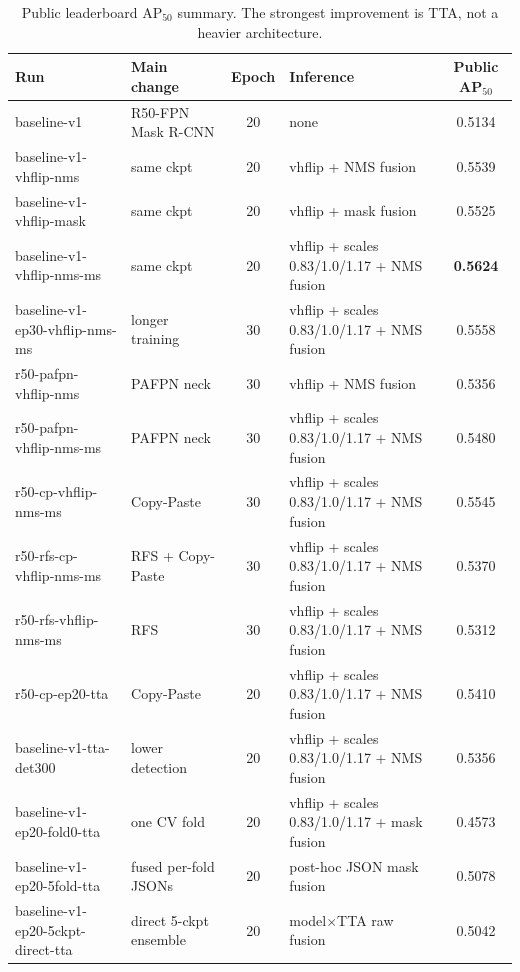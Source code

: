 \documentclass[10pt,twocolumn,letterpaper]{article}
\begin{document}
\begin{table}[t]
  \centering
  \scriptsize
  \setlength{\tabcolsep}{3pt}
  \begin{tabularx}{\textwidth}{p{}p{}cXc}
    \toprule
    \textbf{Run} & \textbf{Main change} & \textbf{Epoch} & \textbf{Inference} & \textbf{Public AP$_{50}$} \\ \midrule
    baseline-v1 & R50-FPN Mask R-CNN & 20 & none & 0.5134 \\
    baseline-v1-vhflip-nms & same ckpt & 20 & vhflip + NMS fusion & 0.5539 \\
    baseline-v1-vhflip-mask & same ckpt & 20 & vhflip + mask fusion & 0.5525 \\
    baseline-v1-vhflip-nms-ms & same ckpt & 20 & vhflip + scales 0.83/1.0/1.17 + NMS fusion & \textbf{0.5624} \\
    baseline-v1-ep30-vhflip-nms-ms & longer training & 30 & vhflip + scales 0.83/1.0/1.17 + NMS fusion & 0.5558 \\
    r50-pafpn-vhflip-nms & PAFPN neck & 30 & vhflip + NMS fusion & 0.5356 \\
    r50-pafpn-vhflip-nms-ms & PAFPN neck & 30 & vhflip + scales 0.83/1.0/1.17 + NMS fusion & 0.5480 \\
    r50-cp-vhflip-nms-ms & Copy-Paste & 30 & vhflip + scales 0.83/1.0/1.17 + NMS fusion & 0.5545 \\
    r50-rfs-cp-vhflip-nms-ms & RFS + Copy-Paste & 30 & vhflip + scales 0.83/1.0/1.17 + NMS fusion & 0.5370 \\
    r50-rfs-vhflip-nms-ms & RFS & 30 & vhflip + scales 0.83/1.0/1.17 + NMS fusion & 0.5312 \\
    r50-cp-ep20-tta & Copy-Paste & 20 & vhflip + scales 0.83/1.0/1.17 + NMS fusion & 0.5410 \\
    baseline-v1-tta-det300 & lower detection & 20 & vhflip + scales 0.83/1.0/1.17 + NMS fusion & 0.5356 \\
    baseline-v1-ep20-fold0-tta & one CV fold & 20 & vhflip + scales 0.83/1.0/1.17 + mask fusion & 0.4573 \\
    baseline-v1-ep20-5fold-tta & fused per-fold JSONs & 20 & post-hoc JSON mask fusion & 0.5078 \\
    baseline-v1-ep20-5ckpt-direct-tta & direct 5-ckpt ensemble & 20 & model$\times$TTA raw fusion & 0.5042 \\
    \bottomrule
  \end{tabularx}
  \caption{Public leaderboard AP$_{50}$ summary. The strongest improvement is TTA, not a heavier architecture.}
  \label{tab:submissions}
\end{table}
\end{document}
